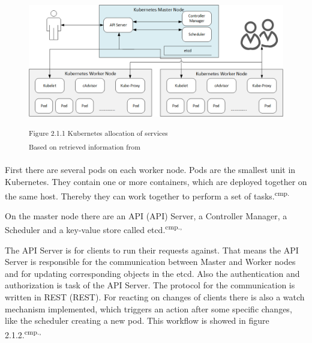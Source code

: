 \begin{figure}[h]
\centering
\includegraphics[width=\textwidth/5*3]{images/kubernetes_service_allocation.png}

\textsuperscript{Figure 2.1.1 Kubernetes allocation of services}\\
\textsuperscript{Based on retrieved information from \cite{13}}
\end{figure}

First there are several pods on each worker node. Pods are the smallest unit in Kubernetes. They contain one or more containers, which are deployed together on the same host. Thereby they can work together to perform a set of tasks.\textsuperscript{cmp.\cite{15}}%

On the master node there are an \acs{API} (\acl{API}) Server, a Controller Manager, a Scheduler and a key-value store called etcd.\textsuperscript{cmp.\cite{13}, \cite{16}}

The API Server is for clients to run their requests against. That means the API Server is responsible for the communication between Master and Worker nodes and for updating corresponding objects in the etcd. Also the authentication and authorization is task of the API Server. The protocol for the communication is written in \acs{REST} (\acl{REST}). For reacting on changes of clients there is also a watch mechanism implemented, which triggers an action after some specific changes, like the scheduler creating a new pod. This workflow is showed in figure 2.1.2.\textsuperscript{cmp.\cite{13}, \cite{16}}

